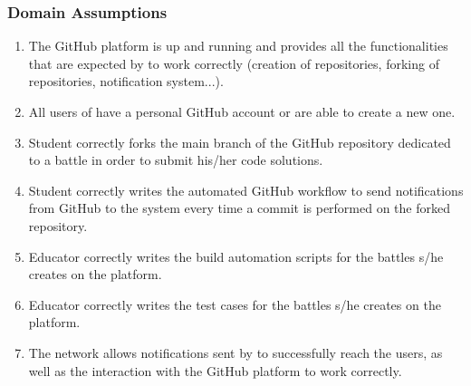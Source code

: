 \subsubsection{Domain Assumptions}
\begin{enumerate}[label=D\arabic*]
		\item The GitHub platform is up and running and provides all the functionalities that are expected by \app to work correctly (creation of repositories, forking of repositories, notification system...).
		\item All users of \app have a personal GitHub account or are able to create a new one.
		\item Student correctly forks the main branch of the GitHub repository dedicated to a battle in order to submit his/her code solutions.
		\item Student correctly writes the automated GitHub workflow to send notifications from GitHub to the system every time a commit is performed on the forked repository.
		\item Educator correctly writes the build automation scripts for the battles s/he creates on the platform.
		\item Educator correctly writes the test cases for the battles s/he creates on the platform.
		\item The network allows notifications sent by \app to successfully reach the users, as well as the interaction with the GitHub platform to work correctly.

	\end{enumerate}